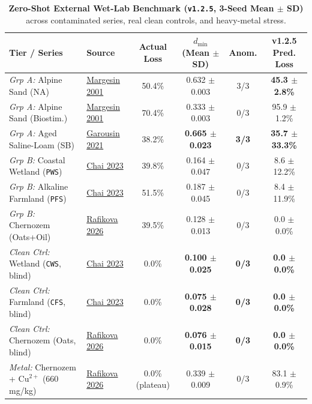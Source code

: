 \documentclass[10pt,twocolumn,a4paper]{article}
\begin{document}
\begin{table}[!htbp]
\centering
\caption{\textbf{Zero-Shot External Wet-Lab Benchmark (\texttt{v1.2.5}, 3-Seed Mean $\pm$ SD)} across contaminated series, real clean controls, and heavy-metal stress.}
\label{tab:v125_ext}
\footnotesize
\begin{tabular}{@{}llcccc@{}}
\toprule
\textbf{Tier / Series} & \textbf{Source} & \textbf{Actual Loss} & \textbf{$d_{\min}$ (Mean $\pm$ SD)} & \textbf{Anom.} & \textbf{v1.2.5 Pred. Loss} \\
\midrule
\textit{Grp A:} Alpine Sand (NA) & \href{https://pmc.ncbi.nlm.nih.gov/articles/PMC92991/}{Margesin 2001} & 50.4\% & 0.632 $\pm$ 0.003 & 3/3 & \textbf{45.3 $\pm$ 2.8\%} \\
\textit{Grp A:} Alpine Sand (Biostim.) & \href{https://pmc.ncbi.nlm.nih.gov/articles/PMC92991/}{Margesin 2001} & 70.4\% & 0.333 $\pm$ 0.003 & 0/3 & 95.9 $\pm$ 1.2\% \\
\textit{Grp A:} Aged Saline-Loam (SB) & \href{https://pmc.ncbi.nlm.nih.gov/articles/PMC7947215/}{Garousin 2021} & 38.2\% & \textbf{0.665 $\pm$ 0.023} & \textbf{3/3} & \textbf{35.7 $\pm$ 33.3\%} \\
\midrule
\textit{Grp B:} Coastal Wetland (\texttt{PWS}) & \href{https://www.frontiersin.org/journals/environmental-science/articles/10.3389/fenvs.2023.1141562/full}{Chai 2023} & 39.8\% & 0.164 $\pm$ 0.047 & 0/3 & 8.6 $\pm$ 12.2\% \\
\textit{Grp B:} Alkaline Farmland (\texttt{PFS}) & \href{https://www.frontiersin.org/journals/environmental-science/articles/10.3389/fenvs.2023.1141562/full}{Chai 2023} & 51.5\% & 0.187 $\pm$ 0.045 & 0/3 & 8.4 $\pm$ 11.9\% \\
\textit{Grp B:} Chernozem (Oats+Oil) & \href{https://pmc.ncbi.nlm.nih.gov/articles/PMC12945044/}{Rafikova 2026} & 39.5\% & 0.128 $\pm$ 0.013 & 0/3 & 0.0 $\pm$ 0.0\% \\
\midrule
\textit{Clean Ctrl:} Wetland (\texttt{CWS}, blind) & \href{https://www.frontiersin.org/journals/environmental-science/articles/10.3389/fenvs.2023.1141562/full}{Chai 2023} & 0.0\% & \textbf{0.100 $\pm$ 0.025} & \textbf{0/3} & \textbf{0.0 $\pm$ 0.0\%} \\
\textit{Clean Ctrl:} Farmland (\texttt{CFS}, blind) & \href{https://www.frontiersin.org/journals/environmental-science/articles/10.3389/fenvs.2023.1141562/full}{Chai 2023} & 0.0\% & \textbf{0.075 $\pm$ 0.028} & \textbf{0/3} & \textbf{0.0 $\pm$ 0.0\%} \\
\textit{Clean Ctrl:} Chernozem (Oats, blind) & \href{https://pmc.ncbi.nlm.nih.gov/articles/PMC12945044/}{Rafikova 2026} & 0.0\% & \textbf{0.076 $\pm$ 0.015} & \textbf{0/3} & \textbf{0.0 $\pm$ 0.0\%} \\
\midrule
\textit{Metal:} Chernozem + $\mathrm{Cu}^{2+}$ ($660$\,mg/kg) & \href{https://pmc.ncbi.nlm.nih.gov/articles/PMC12945044/}{Rafikova 2026} & 0.0\% (plateau) & 0.339 $\pm$ 0.009 & 0/3 & 83.1 $\pm$ 0.9\% \\
\bottomrule
\end{tabular}
\end{table}
\end{document}
